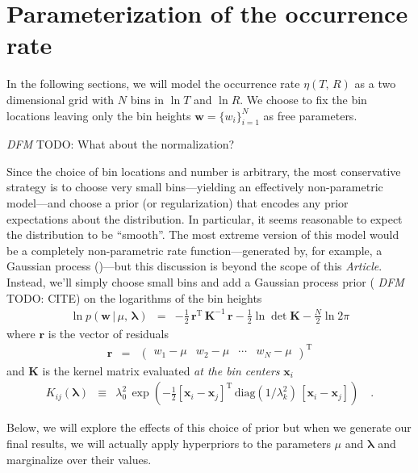 \documentclass[12pt,preprint]{aastex}
\newcommand{\paper}{\emph{Article}}
\newcommand{\bvec}[1]{\ensuremath{\boldsymbol{#1}}}
\newcommand{\todo}[3]{{\color{#2} \emph{#1} TODO: #3}}
\newcommand{\dfmtodo}[1]{\todo{DFM}{red}{#1}}
\newcommand{\rate}{\ensuremath{\eta}}
\newcommand{\radius}{\ensuremath{R}}
\newcommand{\period}{\ensuremath{T}}
\newcommand{\bincenter}{{\ensuremath{\bvec{x}}}}
\newcommand{\binheight}{{\ensuremath{w}}}
\newcommand{\binheights}{{\ensuremath{\bvec{\binheight}}}}
\newcommand{\smooth}{{\ensuremath{\lambda}}}
\begin{document}
\section{Parameterization of the occurrence rate}

In the following sections, we will model the occurrence rate
$\rate(\period,\,\radius)$ as a two dimensional grid with $N$ bins in
$\ln\period$ and $\ln\radius$.
We choose to fix the bin locations leaving only the bin heights
$\binheights = \{\binheight_i\}_{i=1}^{N}$ as free parameters.

\dfmtodo{What about the normalization?}

Since the choice of bin locations and number is arbitrary, the most
conservative strategy is to choose very small bins---yielding an effectively
non-parametric model---and choose a prior (or regularization) that encodes any
prior expectations about the distribution.
In particular, it seems reasonable to expect the distribution to be
``smooth''.
The most extreme version of this model would be a completely non-parametric
rate function---generated by, for example, a Gaussian process
(\citealt{poiss-gp})---but this discussion is beyond the scope of this
\paper.
Instead, we'll simply choose small bins and add a Gaussian process prior
(\dfmtodo{CITE}) on the logarithms of the bin heights
\begin{eqnarray}
\ln p(\binheights\,|\,\mu,\,\bvec{\smooth}) &=&
-\frac{1}{2}\,\bvec{r}^\mathrm{T}\,\bvec{K}^{-1}\,\bvec{r}
-\frac{1}{2}\ln \det \bvec{K} - \frac{N}{2}\ln 2\pi
\end{eqnarray}
where $\bvec{r}$ is the vector of residuals
\begin{eqnarray}
\bvec{r} &=& \left(\begin{array}{cccc}
\binheight_1-\mu & \binheight_2-\mu & \cdots & \binheight_N-\mu
\end{array}\right)^\mathrm{T}
\end{eqnarray}
and $\bvec{K}$ is the kernel matrix evaluated \emph{at the bin centers}
$\bincenter_i$
\begin{eqnarray}
K_{ij}(\bvec{\smooth}) &\equiv& \smooth_0^2\,\exp \left(
-\frac{1}{2}[\bincenter_i-\bincenter_j]^\mathrm{T}\,
\mathrm{diag}(1/\smooth_k^2)\,
[\bincenter_i-\bincenter_j] \right) \quad.
\end{eqnarray}

Below, we will explore the effects of this choice of prior but when we
generate our final results, we will actually apply hyperpriors to the
parameters $\mu$ and $\bvec{\smooth}$ and marginalize over their values.
\end{document}
